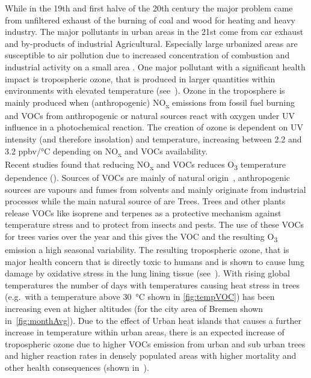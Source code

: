 \documentclass[12pt,a4paper, english,twoside]{article}
\begin{document}
      While in the 19th and first halve of the 20th century the major problem came from unfiltered exhaust of the burning of coal and wood for heating and heavy industry.
      The major pollutants in urban areas in the 21st come from car exhaust and by-products of industrial Agricultural. %
      Especially large urbanized areas are susceptible to air pollution due to increased concentration of combustion and industrial activity on a small area \autocite{Kanakidou2011}.
      One major pollutant with a significant health impact is tropospheric ozone, that is produced in larger quantities within environments with elevated temperature (see~\cite{Ebi2008}). 
      Ozone in the troposphere is mainly produced when (anthropogenic) NO\textsubscript{x} emissions from fossil fuel burning and \glspl{VOC} from anthropogenic or natural sources react with oxygen under UV influence in a photochemical reaction.  
      The creation of ozone is dependent on UV intensity (and therefore insolation) and temperature, increasing between 2.2 and 3.2 ppbv/°C depending on NO\textsubscript{x} and \glspl{VOC} availability. \\
      Recent studies found that reducing NO\textsubscript{x} and \glspl{VOC} reduces O\textsubscript{3} temperature dependence (\cite{Otero2021}).
      Sources of \glspl{VOC} are mainly of natural origin~\autocite{Kansal2009}, anthropogenic sources are vapours and fumes from solvents and mainly originate from industrial processes while the main natural source of  are Trees.
      Trees and other plants release VOCs like isoprene and terpenes as a protective mechanism against temperature stress and to protect from insects and pests. 
      The use of these \glspl{VOC} for trees varies over the year and this gives the \gls{VOC} and the resulting O\textsubscript{3} emission a high seasonal variability. 
      The resulting tropospheric ozone, that is major health concern that is directly toxic to humans and is shown to cause lung damage by oxidative stress in the lung lining tissue (see~\cite{Mudway2000}). 
      With rising global temperatures the number of days with temperatures causing heat stress in trees (e.g.\ with a temperature above 30~°C shown in \cref{fig:tempVOC}) has been increasing even at higher altitudes (for the city area of Bremen shown in~\cref{fig:monthAvg}).
      Due to the effect of Urban heat islands that causes a further increase in temperature within urban areas, there is an expected increase of tropospheric ozone due to higher \glspl{VOC} emission from urban and sub urban trees and higher reaction rates in densely populated areas with higher mortality and other health consequences (shown in~\cite{Ebi2008}).\\ 
\end{document}
